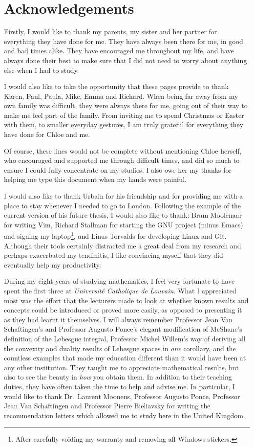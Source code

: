 \chapter*{Acknowledgements}

Firstly, I would like to thank my parents, my sister and her partner for everything they have done for me.
They have always been there for me,
in good and bad times alike.
They have encouraged me throughout my life,
and have always done their best to make sure that I did not need to worry about anything else when I had to study.

I would also like to take the opportunity that these pages provide to thank Karen, Paul, Paula, Mike, Emma and Richard.
When being far away from my own family was difficult,
they were always there for me, going out of their way to make me feel part of the family.
From inviting me to spend Christmas or Easter with them,
to smaller everyday gestures,
I am truly grateful for everything they have done for Chloe and me.

Of course,
these lines would not be complete without mentioning Chloe herself, who encouraged and supported me through difficult times,
and did so much to ensure I could fully concentrate on my studies.
I also owe her my thanks for helping me type this document
when my hands were painful.

I would also like to thank Urbain for his friendship and for providing me with a place to stay whenever I needed to go to London.
Following the example of the current version of his future thesis,
I would also like to thank:
Bram Moolenaar for writing Vim,
Richard Stallman for starting the GNU project (minus Emacs) and signing my laptop\footnote{After carefully voiding my warranty and removing all Windows stickers.},
and Linus Torvalds for developing Linux and Git.
Although their tools certainly distracted me a great deal from my research
and perhaps exacerbated my tendinitis,
I like convincing myself that they did eventually help my productivity.

During my eight years of studying mathematics,
I feel very fortunate to have spent the first three at \emph{Universit\'e Catholique de Louvain}.
What I appreciated most was the effort that the lecturers made to look at
whether known results and concepts could be introduced or proved more easily,
as opposed to presenting it as they had learnt it themselves.
I will always remember Professor Jean Van Schaftingen's and Professor Augusto Ponce's elegant modification of McShane's definition of the Lebesgue integral,
Professor Michel Willem's way of deriving all the convexity and duality results of Lebesgue spaces in \emph{one} corollary,
and the countless examples that made my education different than it would have been at any other institution.
They taught me to appreciate mathematical results,
but also to see the beauty in \emph{how} you obtain them.
In addition to their teaching duties,
they have often taken the time to help and advise me.
In particular,
I would like to thank Dr.\ Laurent Moonens,
Professor Augusto Ponce, Professor Jean Van Schaftingen and Professor Pierre Bieliavsky for writing the recommendation letters which allowed me to study here in the United Kingdom.

